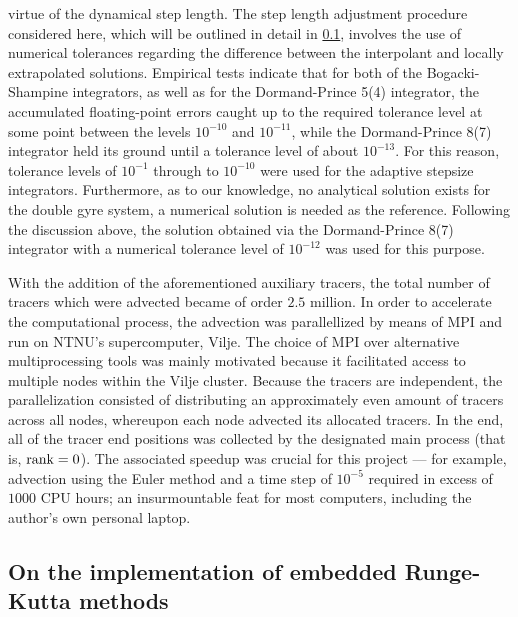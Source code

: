 virtue of the dynamical step length. The step length adjustment procedure
considered here, which will be outlined in detail in
\cref{sub:on_the_implementation_of_embedded_runge_kutta_methods}, involves
the use of numerical tolerances regarding the difference between the interpolant
and locally extrapolated solutions. Empirical tests indicate that for both of the
Bogacki-Shampine integrators, as well as for the Dormand-Prince 5(4) integrator,
the accumulated floating-point errors caught up to the required tolerance level
at some point between the levels $10^{-10}$ and $10^{-11}$, while the
Dormand-Prince 8(7) integrator held its ground until a tolerance level of about
$10^{-13}$. For this reason, tolerance levels of $10^{-1}$ through to $10^{-10}$
were used for the adaptive stepsize integrators. Furthermore, as to our
knowledge, no analytical solution exists for the double gyre system, a numerical
solution is needed as the reference. Following the discussion above, the
solution obtained via the Dormand-Prince 8(7) integrator with a numerical
tolerance level of $10^{-12}$ was used for this purpose.

With the addition of the aforementioned auxiliary tracers, the total number
of tracers which were advected became of order $2.5$ million. In order to
accelerate the computational process, the advection was parallellized by means
of MPI and run on NTNU's supercomputer, Vilje. The choice of MPI over
alternative multiprocessing tools was mainly motivated because it facilitated
access to multiple nodes within the Vilje cluster. Because the tracers are
independent, the parallelization consisted of distributing an approximately
even amount of tracers across all nodes, whereupon each node advected its
allocated tracers. In the end, all of the tracer end positions was collected
by the designated main process (that is, $\textnormal{rank}=0$). The
associated speedup was crucial for this project --- for example, advection using
the Euler method and a time step of $10^{-5}$ required in excess of $1000$
CPU hours; an insurmountable feat for most computers, including the author's own
personal laptop.
\clearpage
\subsection{On the implementation of embedded Runge-Kutta methods}
\label{sub:on_the_implementation_of_embedded_runge_kutta_methods}

